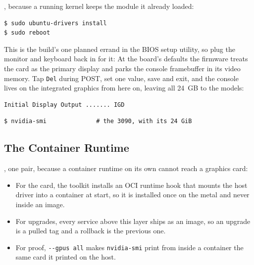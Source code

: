 , because a running kernel keeps the module it
already loaded:

\begin{verbatim}
$ sudo ubuntu-drivers install
$ sudo reboot
\end{verbatim}

 This is the build's one planned
errand in the BIOS setup utility,
so plug the monitor and keyboard back in for it\cite{gigabyteB650EagleAX}: At the
board's defaults the firmware treats the card as the primary display and parks
the console framebuffer in its video memory. Tap \texttt{Del} during POST, set
one value, save and exit, and the console lives on the integrated
graphics from here on, leaving all 24~GB to the
models:

\begin{verbatim}
Initial Display Output ....... IGD
\end{verbatim}



\begin{verbatim}
$ nvidia-smi              # the 3090, with its 24 GiB
\end{verbatim}


\subsection{The Container Runtime}

, one pair, because a
container runtime on its own cannot reach a graphics
card\cite{nvidiaContainerToolkit}:

\begin{itemize}[topsep=0.25em, itemsep=0.4em, parsep=0em]
    \item For the card, the toolkit installs an OCI runtime hook that mounts
    the host driver into a container at start, so it is installed once on the
    metal and never inside an image.
    \item For upgrades, every service above this layer ships as an image, so an
    upgrade is a pulled tag and a rollback is the previous one.
    \item For proof, \texttt{-{}-gpus all} makes \texttt{nvidia-smi} print from
    inside a container the same card it printed on the host.
\end{itemize}

